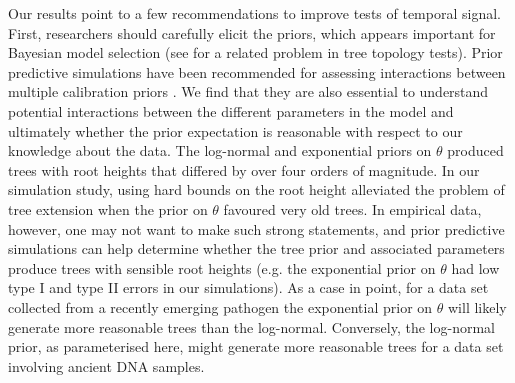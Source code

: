 \documentclass[10pt,letterpaper]{article}
\begin{document}
Our results point to a few recommendations to improve tests of temporal signal. First, researchers should carefully elicit the priors, which appears important for Bayesian model selection (see \cite{bergsten2013bayesian} for a related problem in tree topology tests). Prior predictive simulations have been recommended for assessing interactions between multiple calibration priors \cite{warnock2015calibration}. We find that they are also essential to understand potential interactions between the different parameters in the model and ultimately whether the prior expectation is reasonable with respect to our knowledge about the data. The log-normal and exponential priors on $\theta$ produced trees with root heights that differed by over four orders of magnitude. {In our simulation study, using hard bounds on the root height alleviated the problem of tree extension when the prior on $\theta$ favoured very old trees. In empirical data, however, one may not want to make such strong statements, and prior predictive simulations can help determine whether the tree prior and associated parameters produce trees with sensible root heights (e.g. the exponential prior on $\theta$ had low type I and type II errors in our simulations). As a case in point, for a data set collected from a recently emerging pathogen the exponential prior on $\theta$ will likely generate more reasonable trees than the log-normal. Conversely, the log-normal prior, as parameterised here, might generate more reasonable trees for a data set involving ancient DNA samples.}
\end{document}

